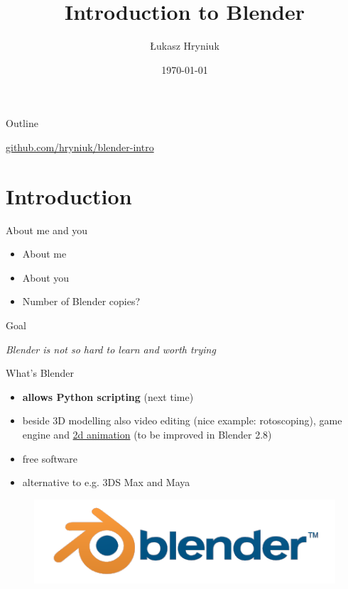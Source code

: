 \documentclass{beamer}
\title[Blender Intro]{Introduction to Blender}
\author{Łukasz Hryniuk}
\date{\today}
\begin{document}
\begin{frame}
  \titlepage
\end{frame}

\begin{frame}{Outline}
  \tableofcontents
  
  \centering \Large
  \href{https://github.com/hryniuk/blender-intro}{github.com/hryniuk/blender-intro}
\end{frame}

\section{Introduction}

\begin{frame}{About me and you}

\begin{itemize}
\item About me
\item About you
\item Number of Blender copies?
\end{itemize}

\end{frame}

\begin{frame}{Goal}

\centering \Huge
\emph{Blender is not so hard to learn and worth trying}

\end{frame}

\begin{frame}{What's Blender}

\begin{itemize}
  \item \textbf{allows Python scripting} (next time)
  \item beside 3D modelling also video editing (nice example: rotoscoping), game engine and \href{https://www.youtube.com/watch?v=L1Wl3YoRe8w}{2d animation} (to be improved in Blender 2.8)
  \item free software
  \item alternative to e.g. 3DS Max and Maya
\end{itemize}

\begin{figure}
\includegraphics[scale=0.15]{logo.png}
\end{figure}

\end{frame}
\end{document}
